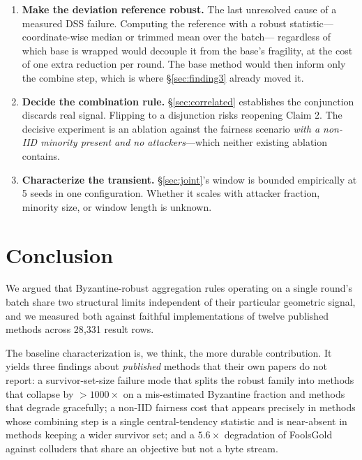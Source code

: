 \documentclass[11pt,a4paper]{article}
\begin{document}
\begin{enumerate}
  \item \textbf{Make the deviation reference robust.} The last unresolved
    cause of a measured DSS failure. Computing the reference with a robust
    statistic---coordinate-wise median or trimmed mean over the batch---
    regardless of which base is wrapped would decouple it from the base's
    fragility, at the cost of one extra reduction per round. The base
    method would then inform only the combine step, which is where
    \S\ref{sec:finding3} already moved it.

  \item \textbf{Decide the combination rule.} \S\ref{sec:correlated}
    establishes the conjunction discards real signal. Flipping to a
    disjunction risks reopening Claim 2. The decisive experiment is an
    ablation against the fairness scenario \emph{with a non-IID minority
    present and no attackers}---which neither existing ablation contains.

  \item \textbf{Characterize the transient.} \S\ref{sec:joint}'s window is
    bounded empirically at 5 seeds in one configuration. Whether it scales
    with attacker fraction, minority size, or window length is unknown.
\end{enumerate}

\section{Conclusion}

We argued that Byzantine-robust aggregation rules operating on a single
round's batch share two structural limits independent of their particular
geometric signal, and we measured both against faithful implementations of
twelve published methods across 28{,}331 result rows.

The baseline characterization is, we think, the more durable contribution.
It yields three findings about \emph{published} methods that their own
papers do not report: a survivor-set-size failure mode that splits the
robust family into methods that collapse by ${>}1000\times$ on a
mis-estimated Byzantine fraction and methods that degrade gracefully; a
non-IID fairness cost that appears precisely in methods whose combining
step is a single central-tendency statistic and is near-absent in methods
keeping a wider survivor set; and a $5.6\times$ degradation of FoolsGold
against colluders that share an objective but not a byte stream.
\end{document}
